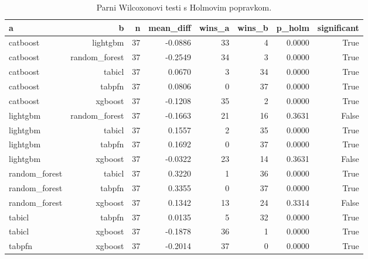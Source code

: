 \begin{table}[htbp]
\centering
\caption{Parni Wilcoxonovi testi s Holmovim popravkom.}
\label{tab:wilcoxon-nonsaturated}
\begin{tabular}{lrrrrrrr}
\hline
a & b & n & mean\_diff & wins\_a & wins\_b & p\_holm & significant \\
\hline
catboost & lightgbm & 37 & -0.0886 & 33 & 4 & 0.0000 & True \\
catboost & random\_forest & 37 & -0.2549 & 34 & 3 & 0.0000 & True \\
catboost & tabicl & 37 & 0.0670 & 3 & 34 & 0.0000 & True \\
catboost & tabpfn & 37 & 0.0806 & 0 & 37 & 0.0000 & True \\
catboost & xgboost & 37 & -0.1208 & 35 & 2 & 0.0000 & True \\
lightgbm & random\_forest & 37 & -0.1663 & 21 & 16 & 0.3631 & False \\
lightgbm & tabicl & 37 & 0.1557 & 2 & 35 & 0.0000 & True \\
lightgbm & tabpfn & 37 & 0.1692 & 0 & 37 & 0.0000 & True \\
lightgbm & xgboost & 37 & -0.0322 & 23 & 14 & 0.3631 & False \\
random\_forest & tabicl & 37 & 0.3220 & 1 & 36 & 0.0000 & True \\
random\_forest & tabpfn & 37 & 0.3355 & 0 & 37 & 0.0000 & True \\
random\_forest & xgboost & 37 & 0.1342 & 13 & 24 & 0.3314 & False \\
tabicl & tabpfn & 37 & 0.0135 & 5 & 32 & 0.0000 & True \\
tabicl & xgboost & 37 & -0.1878 & 36 & 1 & 0.0000 & True \\
tabpfn & xgboost & 37 & -0.2014 & 37 & 0 & 0.0000 & True \\
\hline
\end{tabular}
\end{table}
